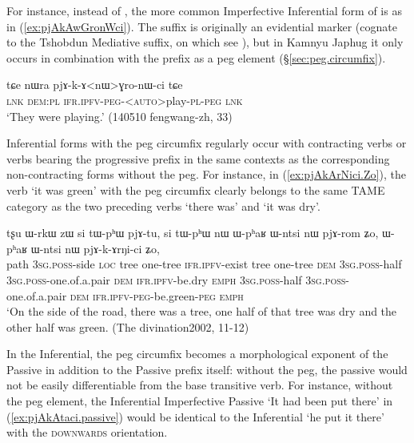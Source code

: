 For instance, instead of , the more common Imperfective Inferential form of   is  as in (\ref{ex:pjAkAwGronWci}). The  suffix is originally an evidential marker (cognate to the Tshobdun   Mediative suffix, on which see \citealt[564]{jackson17tshobdun}), but in Kamnyu Japhug it only occurs in combination with the  prefix as a peg element (§\ref{sec:peg.circumfix}).

\begin{exe}
\ex \label{ex:pjAkAwGronWci}
 \gll  tɕe nɯra pjɤ-k-ɤ<nɯ>ɣro-nɯ-ci tɕe \\
 \textsc{lnk} \textsc{dem}:\textsc{pl} \textsc{ifr}.\textsc{ipfv}-\textsc{peg}-<\textsc{auto}>play-\textsc{pl}-\textsc{peg} \textsc{lnk} \\
 \glt `They were playing.' (140510 fengwang-zh, 33)
\end{exe}

Inferential forms with the peg circumfix   regularly occur with contracting verbs or verbs bearing the progressive prefix in the same contexts as the corresponding non-contracting forms without the peg. For instance, in (\ref{ex:pjAkArNici.Zo}), the verb  `it was green' with the peg circumfix clearly belongs to the same TAME category as the two preceding verbs   `there was' and  `it was dry'. 
 
\begin{exe}
\ex \label{ex:pjAkArNici.Zo}
 \gll  tʂu ɯ-rkɯ zɯ si tɯ-pʰɯ pjɤ-tu,  si tɯ-pʰɯ nɯ ɯ-pʰaʁ ɯ-ntsi nɯ pjɤ-rom ʑo, ɯ-pʰaʁ ɯ-ntsi nɯ pjɤ-k-ɤrŋi-ci ʑo,\\
path \textsc{3sg}.\textsc{poss}-side \textsc{loc} tree one-tree \textsc{ifr}.\textsc{ipfv}-exist tree one-tree \textsc{dem} \textsc{3sg}.\textsc{poss}-half \textsc{3sg}.\textsc{poss}-one.of.a.pair \textsc{dem} \textsc{ifr}.\textsc{ipfv}-be.dry \textsc{emph} \textsc{3sg}.\textsc{poss}-half \textsc{3sg}.\textsc{poss}-one.of.a.pair \textsc{dem} \textsc{ifr}.\textsc{ipfv}-\textsc{peg}-be.green-\textsc{peg} \textsc{emph}\\
\glt `On the side of the road, there was a tree, one half of that tree was dry and the other half was green. (The divination2002, 11-12)
\end{exe}

In the Inferential, the peg circumfix becomes a morphological exponent of the Passive in addition to the Passive prefix  itself: without the peg, the passive would not be easily differentiable from the base transitive verb. For instance, without the peg element, the Inferential Imperfective Passive  `It had been put there' in (\ref{ex:pjAkAtaci.passive}) would be identical to the Inferential  `he put it there' with the \textsc{downwards} orientation.


